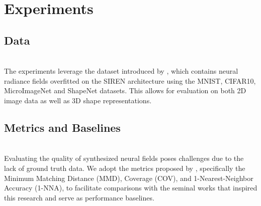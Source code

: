\section{Experiments}
\label{sec:exper}
\subsection*{Data}\\
The experiments leverage the dataset introduced by \cite{papa2023train}, which contains neural radiance fields overfitted on the SIREN architecture using the MNIST, CIFAR10, MicroImageNet and ShapeNet datasets. This allows for evaluation on both 2D image data as well as 3D shape representations. \\
\subsection*{Metrics and Baselines}\\
Evaluating the quality of synthesized neural fields poses challenges due to the lack of ground truth data. We adopt the metrics proposed by \cite{erkoç2023hyperdiffusion}, specifically the Minimum Matching Distance (MMD), Coverage (COV), and 1-Nearest-Neighbor Accuracy (1-NNA), to facilitate comparisons with the seminal works that inspired this research and serve as performance baselines. \\